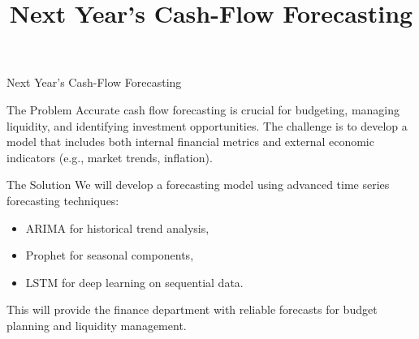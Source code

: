 \documentclass[10pt,pdf,hyperref={unicode}]{beamer}
\title{Next Year's Cash-Flow Forecasting}
\begin{document}
	
	\setcounter{page}{1}
	
	\begin{frame}{Next Year's Cash-Flow Forecasting}
		
		\begin{block}{The Problem}
			Accurate cash flow forecasting is crucial for budgeting, managing liquidity, and identifying investment opportunities. The challenge is to develop a model that includes both internal financial metrics and external economic indicators (e.g., market 
			trends, inflation).
		\end{block}
		
		\begin{block}{The Solution}
			We will develop a forecasting model using advanced time series forecasting techniques:
			\begin{itemize}
				\item ARIMA for historical trend analysis,
				\item Prophet for seasonal components,
				\item LSTM for deep learning on sequential data.
			\end{itemize}
			This will provide the finance department with reliable forecasts for budget planning and liquidity management.
		\end{block}
		
	\end{frame}
	
	\setcounter{page}{2}
	
\end{document}
